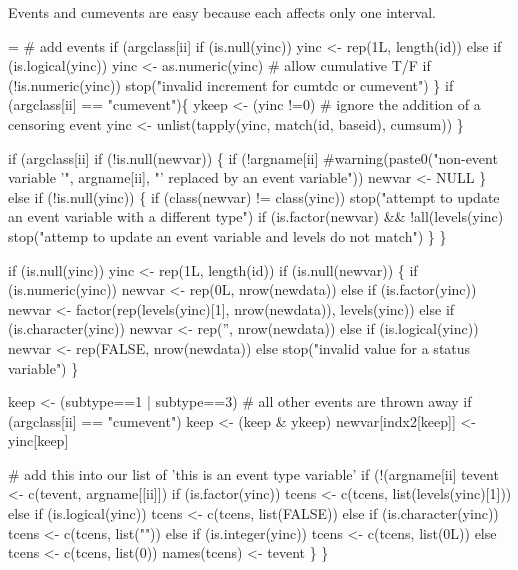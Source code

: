 \documentclass{article}
\begin{document}
Events and cumevents are easy because
each affects only one interval.
\begin{nwchunk}
=
 # add events
 if (argclass[ii] %
     if (is.null(yinc)) yinc <- rep(1L, length(id))
     else if (is.logical(yinc)) yinc <- as.numeric(yinc)  # allow cumulative T/F
     if (!is.numeric(yinc)) stop("invalid increment for cumtdc or cumevent")
 \}   
 if (argclass[ii] == "cumevent")\{
     ykeep <- (yinc !=0)  # ignore the addition of a censoring event
     yinc <- unlist(tapply(yinc, match(id, baseid), cumsum))
 \}
 
 if (argclass[ii] %
     if (!is.null(newvar)) \{
         if (!argname[ii] %
             #warning(paste0("non-event variable '", argname[ii], "' replaced by an event variable"))
             newvar <- NULL
         \}
         else if (!is.null(yinc)) \{
             if (class(newvar) != class(yinc)) 
                stop("attempt to update an event variable with a different type")
             if (is.factor(newvar) && !all(levels(yinc) %
                stop("attemp to update an event variable and levels do not match")
         \}
     \}
 
     if (is.null(yinc)) yinc <- rep(1L, length(id))
     if (is.null(newvar)) \{
         if (is.numeric(yinc)) newvar <- rep(0L, nrow(newdata))
         else if (is.factor(yinc)) 
             newvar <- factor(rep(levels(yinc)[1], nrow(newdata)),
                              levels(yinc))
         else if (is.character(yinc)) newvar <- rep('', nrow(newdata))
         else if (is.logical(yinc)) newvar <- rep(FALSE, nrow(newdata))
         else stop("invalid value for a status variable")
     \}
  
     keep <- (subtype==1 | subtype==3) # all other events are thrown away
     if (argclass[ii] == "cumevent") keep <- (keep & ykeep)
     newvar[indx2[keep]] <- yinc[keep]
     
     # add this into our list of 'this is an event type variable'
     if (!(argname[ii] %
         tevent <- c(tevent, argname[[ii]])
         if (is.factor(yinc)) tcens <- c(tcens, list(levels(yinc)[1]))
         else if (is.logical(yinc)) tcens <- c(tcens, list(FALSE))
         else if (is.character(yinc)) tcens <- c(tcens, list(""))
         else if (is.integer(yinc))   tcens <- c(tcens, list(0L))
         else tcens <- c(tcens, list(0))
         names(tcens) <- tevent
     \}
 \}
 

\end{nwchunk}
\end{document}
